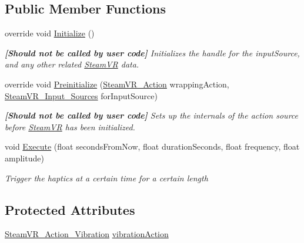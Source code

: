 \subsection*{Public Member Functions}
\begin{DoxyCompactItemize}
\item 
override void \mbox{\hyperlink{class_valve_1_1_v_r_1_1_steam_v_r___action___vibration___source_afb6813404b87deef9ec2352046d739eb}{Initialize}} ()
\begin{DoxyCompactList}\small\item\em {\bfseries{\mbox{[}Should not be called by user code\mbox{]}}} Initializes the handle for the input\+Source, and any other related \mbox{\hyperlink{class_valve_1_1_v_r_1_1_steam_v_r}{Steam\+VR}} data. \end{DoxyCompactList}\item 
override void \mbox{\hyperlink{class_valve_1_1_v_r_1_1_steam_v_r___action___vibration___source_a4fcbc01468b2bfd6be93ef24f6ae1aa3}{Preinitialize}} (\mbox{\hyperlink{class_valve_1_1_v_r_1_1_steam_v_r___action}{Steam\+V\+R\+\_\+\+Action}} wrapping\+Action, \mbox{\hyperlink{namespace_valve_1_1_v_r_a82e5bf501cc3aa155444ee3f0662853f}{Steam\+V\+R\+\_\+\+Input\+\_\+\+Sources}} for\+Input\+Source)
\begin{DoxyCompactList}\small\item\em {\bfseries{\mbox{[}Should not be called by user code\mbox{]}}} Sets up the internals of the action source before \mbox{\hyperlink{class_valve_1_1_v_r_1_1_steam_v_r}{Steam\+VR}} has been initialized. \end{DoxyCompactList}\item 
void \mbox{\hyperlink{class_valve_1_1_v_r_1_1_steam_v_r___action___vibration___source_a657db1c2eaf70175fb41b3f28d215edb}{Execute}} (float seconds\+From\+Now, float duration\+Seconds, float frequency, float amplitude)
\begin{DoxyCompactList}\small\item\em Trigger the haptics at a certain time for a certain length \end{DoxyCompactList}\end{DoxyCompactItemize}
\subsection*{Protected Attributes}
\begin{DoxyCompactItemize}
\item 
\mbox{\hyperlink{class_valve_1_1_v_r_1_1_steam_v_r___action___vibration}{Steam\+V\+R\+\_\+\+Action\+\_\+\+Vibration}} \mbox{\hyperlink{class_valve_1_1_v_r_1_1_steam_v_r___action___vibration___source_a8f0e168bf7b928aa71c8d02d7ec6d7fd}{vibration\+Action}}
\end{DoxyCompactItemize}
